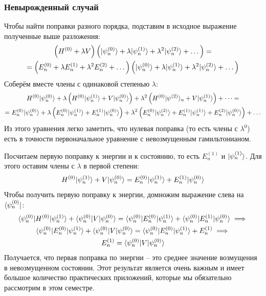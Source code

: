 \subsubsection{Невырожденный случай}
Чтобы найти поправки разного порядка, подставим в исходное выражение полученные
выше разложения:
\begin{multline*}
  \left(H^{(0)} + \lambda V\right)\left(\lvert\psi^{(0)}_n\rangle + \lambda\lvert\psi^{(1)}_n\rangle +\lambda^2\lvert\psi^{(2)}_n\rangle + \dots\right) =\\ = \left(E^{(0)}_n + \lambda E^{(1)}_n + \lambda^2E^{(2)}_n + \dots\right)\left(\lvert\psi^{(0)}_n\rangle + \lambda\lvert\psi^{(1)}_n\rangle +\lambda^2\lvert\psi^{(2)}_n\rangle + \dots\right)
\end{multline*}
Соберём вместе члены с одинаковой степенью $\lambda$:
\begin{multline*}
  H^{(0)}\lvert\psi^{(0)}_n\rangle + \lambda \left(H^{(0)}\lvert\psi^{(1)}_n\rangle + V\lvert\psi^{(0)}_n\rangle\right) + \lambda^2 \left(H^{(0)}\lvert\psi^{(2)}\rangle_n + V\lvert\psi^{(1)}_n\rangle\right) + \dots =\\= E^{(0)}_n\lvert\psi^{(0)}_n\rangle + \lambda \left(E^{(0)}_n\lvert\psi^{(1)}_n\rangle + E^{(1)}_n\lvert\psi^{(0)}_n\rangle\right) + \lambda^2 \left(E^{(0)}_n\lvert\psi^{(2)}_n\rangle + E^{(1)}_n\lvert\psi^{(1)}_n\rangle + E^{(2)}_n\lvert\psi^{(0)}_n\rangle\right) + \dots
\end{multline*}
Из этого уравнения легко заметить, что нулевая поправка (то есть члены с
$\lambda^{0}$) есть в точности первоначальное уравнение с невозмущенным
гамильтонианом.

Посчитаем первую поправку к энергии и к состоянию, то есть $E^{(1)}_n$ и
$\lvert\psi^{(1)}_n\rangle$. Для этого оставим члены с $\lambda$ в первой степени:
\[
  H^{(0)}\lvert\psi^{(1)}_n\rangle + V \lvert\psi^{(0)}_n\rangle = E^{(0)}_n\lvert\psi^{(1)}_n\rangle + E_n^{(1)}\lvert\psi^{(0)}_n\rangle
\]
Чтобы получить первую поправку к энергии, домножим выражение слева на
$\langle\psi^{(0)}_n\rvert$:
\begin{gather*}
  \langle\psi^{(0)}_n\rvert H^{(0)}\lvert\psi^{(1)}_n\rangle + \langle\psi^{(0)}_n\rvert V\lvert\psi^{(0)}_n\rangle = \langle\psi^{(0)}_n\rvert E^{(0)}_n\lvert\psi^{(1)}_n\rangle + \langle\psi^{(0)}_n\rvert E^{(1)}_n\lvert\psi^{(0)}_n\rangle \implies\\
  \langle\psi^{(0)}_n\rvert E^{(0)}_n\lvert\psi^{(1)}_n\rangle + \langle\psi^{(0)}_n\rvert V\lvert\psi^{(0)}_n\rangle = \langle\psi^{(0)}_n\rvert E^{(0)}_n\lvert\psi^{(1)}_n\rangle + E^{(1)}_n \implies\\
  E^{(1)}_n = \langle\psi^{(0)}_n\rvert V\lvert\psi^{(0)}_n\rangle
\end{gather*}
Получается, что первая поправка по энергии – это среднее значение возмущения в
невозмущенном состоянии. Этот результат является очень важным и имеет большое
количество практических приложений, которые мы обязательно рассмотрим в этом
семестре.

